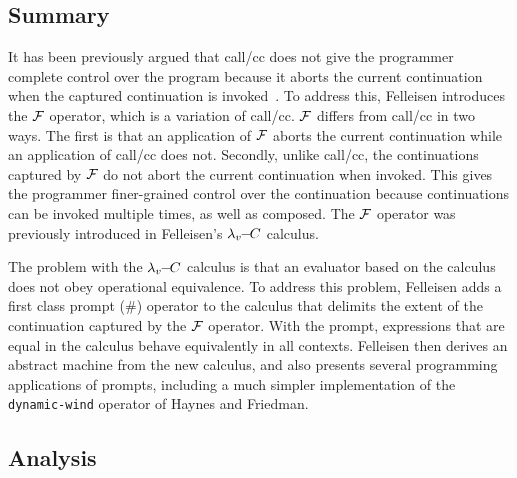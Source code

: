 \documentclass[letterpaper]{llncs}
\begin{document}

\subsection*{Summary}
It has been previously argued that call/cc does not give the programmer complete control over the program because it aborts the current continuation when the captured continuation is invoked~\cite{Felleisen1987SyntacticTheory}. To address this, Felleisen introduces the $ \mathcal{F} $ operator, which is a variation of call/cc. $ \mathcal{F} $ differs from call/cc in two ways. The first is that an application of $ \mathcal{F} $ aborts the current continuation while an application of call/cc does not. Secondly, unlike call/cc, the continuations captured by $ \mathcal{F} $ do not abort the current continuation when invoked. This gives the programmer finer-grained control over the continuation because continuations can be invoked multiple times, as well as composed. The $ \mathcal{F} $ operator was previously introduced in Felleisen's $ \lambda_v\!\!-\!\!C $ calculus.

The problem with the $ \lambda_v\!\!-\!\!C $ calculus is that an evaluator based on the calculus does not obey operational equivalence. To address this problem, Felleisen adds a first class prompt (\#) operator to the calculus that delimits the extent of the continuation captured by the $ \mathcal{F} $ operator. With the prompt, expressions that are equal in the calculus behave equivalently in all contexts. Felleisen then derives an abstract machine from the new calculus, and also presents several programming applications of prompts, including a much simpler implementation of the \texttt{dynamic-wind} operator of Haynes and Friedman.

\subsection*{Analysis}
\end{document}

